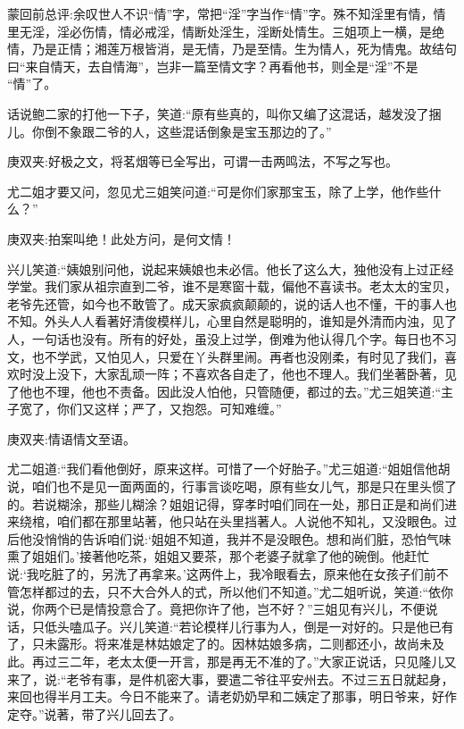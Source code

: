 
\begin{parag}
    \begin{note}蒙回前总评:余叹世人不识“情”字，常把“淫”字当作“情”字。殊不知淫里有情，情里无淫，淫必伤情，情必戒淫，情断处淫生，淫断处情生。三姐项上一横，是绝情，乃是正情；湘莲万根皆消，是无情，乃是至情。生为情人，死为情鬼。故结句曰“来自情天，去自情海”，岂非一篇至情文字？再看他书，则全是“淫”不是 “情”了。\end{note}
\end{parag}


\begin{parag}
    话说鲍二家的打他一下子，笑道:“原有些真的，叫你又编了这混话，越发没了捆儿。你倒不象跟二爷的人，这些混话倒象是宝玉那边的了。”\begin{note}庚双夹:好极之文，将茗烟等已全写出，可谓一击两鸣法，不写之写也。\end{note}尤二姐才要又问，忽见尤三姐笑问道:“可是你们家那宝玉，除了上学，他作些什么？”\begin{note}庚双夹:拍案叫绝！此处方问，是何文情！\end{note}兴儿笑道:“姨娘别问他，说起来姨娘也未必信。他长了这么大，独他没有上过正经学堂。我们家从祖宗直到二爷，谁不是寒窗十载，偏他不喜读书。老太太的宝贝，老爷先还管，如今也不敢管了。成天家疯疯颠颠的，说的话人也不懂，干的事人也不知。外头人人看著好清俊模样儿，心里自然是聪明的，谁知是外清而内浊，见了人，一句话也没有。所有的好处，虽没上过学，倒难为他认得几个字。每日也不习文，也不学武，又怕见人，只爱在丫头群里闹。再者也没刚柔，有时见了我们，喜欢时没上没下，大家乱顽一阵；不喜欢各自走了，他也不理人。我们坐著卧著，见了他也不理，他也不责备。因此没人怕他，只管随便，都过的去。”尤三姐笑道:“主子宽了，你们又这样；严了，又抱怨。可知难缠。”\begin{note}庚双夹:情语情文至语。\end{note}尤二姐道:“我们看他倒好，原来这样。可惜了一个好胎子。”尤三姐道:“姐姐信他胡说，咱们也不是见一面两面的，行事言谈吃喝，原有些女儿气，那是只在里头惯了的。若说糊涂，那些儿糊涂？姐姐记得，穿孝时咱们同在一处，那日正是和尚们进来绕棺，咱们都在那里站著，他只站在头里挡著人。人说他不知礼，又没眼色。过后他没悄悄的告诉咱们说:‘姐姐不知道，我并不是没眼色。想和尚们脏，恐怕气味熏了姐姐们。’接著他吃茶，姐姐又要茶，那个老婆子就拿了他的碗倒。他赶忙说:‘我吃脏了的，另洗了再拿来。’这两件上，我冷眼看去，原来他在女孩子们前不管怎样都过的去，只不大合外人的式，所以他们不知道。”尤二姐听说，笑道:“依你说，你两个已是情投意合了。竟把你许了他，岂不好？”三姐见有兴儿，不便说话，只低头嗑瓜子。兴儿笑道:“若论模样儿行事为人，倒是一对好的。只是他已有了，只未露形。将来准是林姑娘定了的。因林姑娘多病，二则都还小，故尚未及此。再过三二年，老太太便一开言，那是再无不准的了。”大家正说话，只见隆儿又来了，说:“老爷有事，是件机密大事，要遣二爷往平安州去。不过三五日就起身，来回也得半月工夫。今日不能来了。请老奶奶早和二姨定了那事，明日爷来，好作定夺。”说著，带了兴儿回去了。
\end{parag}



